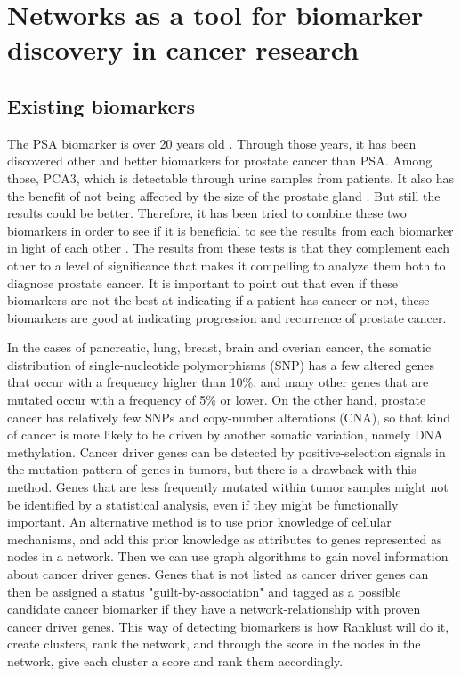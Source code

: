 \chapter{Networks as a tool for biomarker discovery in cancer research}
\section{Existing biomarkers}
The PSA biomarker is over 20 years old \cite{psa-age}. Through those years, it
has been discovered other and better biomarkers for prostate cancer than PSA.
Among those, PCA3, which is detectable through urine samples from patients. It
also has the benefit of not being affected by the size of the prostate gland
\cite{pca3-size}. But still the results could be better. Therefore, it has been
tried to combine these two biomarkers in order to see if it is beneficial to see
the results from each biomarker in light of each other \cite{beyondpsa}. The
results from these tests is that they complement each other to a level of
significance that makes it compelling to analyze them both to diagnose prostate
cancer. It is important to point out that even if these biomarkers are not the
best at indicating if a patient has cancer or not, these biomarkers are good at
indicating progression and recurrence of prostate cancer.

In the cases of pancreatic, lung, breast, brain and overian cancer, the somatic
distribution of single-nucleotide polymorphisms (SNP) has a few altered genes
that occur with a frequency higher than 10\%, and many other genes that are
mutated occur with a frequency of 5\% or lower\cite{pathway-network}. On the
other hand, prostate cancer has relatively few SNPs and copy-number alterations
(CNA), so that kind of cancer is more likely to be driven by another somatic
variation, namely DNA methylation. Cancer driver genes can be detected by
positive-selection signals in the mutation pattern of genes in tumors, but there
is a drawback with this method. Genes that are less frequently mutated within
tumor samples might not be identified by a statistical analysis, even if they
might be functionally important. An alternative method is to use prior knowledge
of cellular mechanisms, and add this prior knowledge as attributes to genes
represented as nodes in a network. Then we can use graph algorithms to gain
novel information about cancer driver genes. Genes that is not listed as cancer
driver genes can then be assigned a status "guilt-by-association" and tagged as
a possible candidate cancer biomarker if they have a network-relationship with
proven cancer driver genes. This way of detecting biomarkers is how Ranklust
will do it, create clusters, rank the network, and through the score in the
nodes in the network, give each cluster a score and rank them accordingly.

